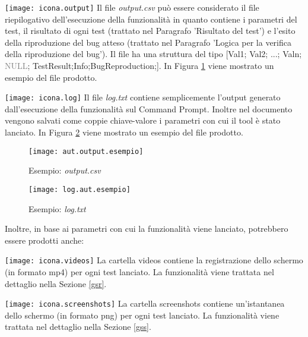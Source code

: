 \begin{tcolorbox}[colback=white, colframe=lightgray]
	 \texttt{[image: icona.output]} \newline
Il file \emph{output.csv} può essere considerato il file riepilogativo dell'esecuzione della funzionalità in quanto contiene i parametri del test, il risultato di ogni test (trattato nel Paragrafo 'Risultato del test') e l'esito della riproduzione del bug atteso (trattato nel Paragrafo 'Logica per la verifica della riproduzione del bug'). Il file ha una struttura del tipo [Val1; Val2; ...; Valn; \textcolor{gray}{NULL}; TestResult;Info;BugReproduction;]. In Figura \ref{fig:aut.output.es} viene mostrato un esempio del file prodotto. 
\end{tcolorbox}

\begin{tcolorbox}[colback=white, colframe=lightgray]
	 \texttt{[image: icona.log]} \newline
Il file \emph{log.txt} contiene semplicemente l'output generato dall'esecuzione della funzionalità sul Command Prompt. Inoltre nel documento vengono salvati come coppie chiave-valore i parametri con cui il tool è stato lanciato. In Figura \ref{fig:aut.log.es} viene mostrato un esempio del file prodotto.  
\end{tcolorbox}


\begin{figure}[H]
	\texttt{[image: aut.output.esempio]}
	\centering
	\caption{Esempio: \emph{output.csv}}
    \label{fig:aut.output.es}
\end{figure}

\begin{figure}[H]
	\texttt{[image: log.aut.esempio]}
	\centering
	\caption{Esempio: \emph{log.txt}}
    \label{fig:aut.log.es}
\end{figure}

\noindent Inoltre, in base ai parametri con cui la funzionalità viene lanciato, potrebbero essere prodotti anche:
\begin{tcolorbox}[colback=white, colframe=lightgray]
	 \texttt{[image: icona.videos]} \newline
La cartella videos contiene la registrazione dello schermo (in formato mp4) per ogni test lanciato. La funzionalità viene trattata nel dettaglio nella Sezione \ref{gsr}.
\end{tcolorbox}

\begin{tcolorbox}[colback=white, colframe=lightgray]
	 \texttt{[image: icona.screenshots]} \newline
La cartella screenshots contiene un'istantanea dello schermo (in formato png) per ogni test lanciato. La funzionalità viene trattata nel dettaglio nella Sezione \ref{gss}.
\end{tcolorbox}

